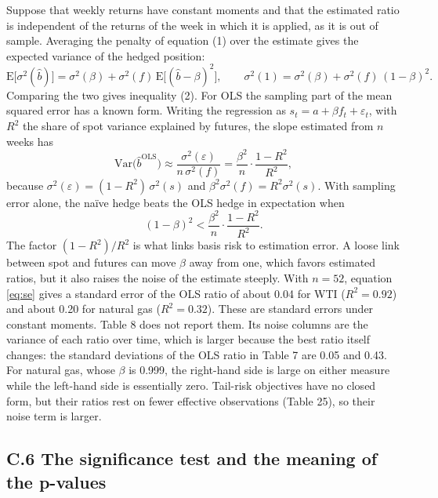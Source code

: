 \documentclass[11pt,letterpaper]{article}
\begin{document}
Suppose that weekly returns have constant moments and that the estimated ratio is independent of the returns of the week in which it is applied, as it is out of sample. Averaging the penalty of equation (1) over the estimate gives the expected variance of the hedged position:
\begin{equation}
\mathrm{E}\big[\sigma^2(\hat b)\big] = \sigma^2(\beta) + \sigma^2(f)\,\mathrm{E}\big[(\hat b - \beta)^2\big], \qquad \sigma^2(1) = \sigma^2(\beta) + \sigma^2(f)\,(1-\beta)^2 .
\end{equation}
Comparing the two gives inequality (2). For OLS the sampling part of the mean squared error has a known form. Writing the regression as $s_t = a + \beta f_t + \varepsilon_t$, with $R^2$ the share of spot variance explained by futures, the slope estimated from $n$ weeks has
\begin{equation}\label{eq:se}
\mathrm{Var}\big(\hat b^{\mathrm{OLS}}\big) \approx \frac{\sigma^2(\varepsilon)}{n\,\sigma^2(f)} = \frac{\beta^2}{n}\cdot\frac{1-R^2}{R^2},
\end{equation}
because $\sigma^2(\varepsilon) = (1-R^2)\,\sigma^2(s)$ and $\beta^2\sigma^2(f) = R^2\sigma^2(s)$. With sampling error alone, the naïve hedge beats the OLS hedge in expectation when
\begin{equation}
(1-\beta)^2 < \frac{\beta^2}{n}\cdot\frac{1-R^2}{R^2} .
\end{equation}
The factor $(1-R^2)/R^2$ is what links basis risk to estimation error. A loose link between spot and futures can move $\beta$ away from one, which favors estimated ratios, but it also raises the noise of the estimate steeply. With $n = 52$, equation \eqref{eq:se} gives a standard error of the OLS ratio of about 0.04 for WTI ($R^2 = 0.92$) and about 0.20 for natural gas ($R^2 = 0.32$). These are standard errors under constant moments. Table 8 does not report them. Its noise columns are the variance of each ratio over time, which is larger because the best ratio itself changes: the standard deviations of the OLS ratio in Table 7 are 0.05 and 0.43. For natural gas, whose $\beta$ is 0.999, the right-hand side is large on either measure while the left-hand side is essentially zero. Tail-risk objectives have no closed form, but their ratios rest on fewer effective observations (Table 25), so their noise term is larger.

\subsection*{C.6 The significance test and the meaning of the p-values}
\end{document}
